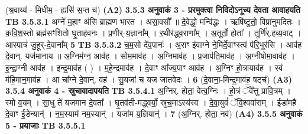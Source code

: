 \documentclass[17pt]{extarticle}
\begin{document}
{{{{{{{{{{{{{{{{{{{                  \newline
                                    (श्र॒वाय्य॑ - मिधीम॒ - ह्यसि॑ स॒प्त च॑) \textbf{(A2)} \newline \newline
                \textbf{ 3.5.3     अनुवाकं   3 - प्ररमुक्त्वा निविदोऽनूच्य देवता आवाहयति} \newline
                                \textbf{ TB 3.5.3.1} \newline
                  अग्ने॑ म॒हाꣳ अ॑सि ब्राह्मण भारत । असा॒वसौ᳚ ॥ दे॒वेद्धो॒ मन्वि॑द्धः । ऋषि॑ष्टुतो॒ विप्रा॑नुमदितः । क॒वि॒श॒स्तो ब्रह्म॑सꣳशितो घृ॒ताह॑वनः । प्र॒णीर्-य॒ज्ञाना᳚म् । र॒थीर॑द्ध्व॒राणा᳚म् । अ॒तूर्तो॒ होता᳚ । तूर्णि॑र्.हव्य॒वाट् । आस्पात्रं॑ जु॒हूर्-दे॒वाना᳚म् \textbf{ 5} \newline
                  \newline
                                \textbf{ TB 3.5.3.2} \newline
                  च॒म॒सो दे॑व॒पानः॑ । अ॒राꣳ इ॑वाग्ने ने॒मिर्दे॒वाꣳस्त्वं प॑रि॒भूर॑सि । आव॑ह दे॒वान्. यज॑मानाय ॥ अ॒ग्निम॑ग्न॒ आव॑ह । सोम॒माव॑ह । अ॒ग्निमाव॑ह । प्र॒जाप॑ति॒माव॑ह । अ॒ग्नीषोमा॒वाव॑ह । इ॒न्द्रा॒ग्नी आव॑ह । इन्द्र॒माव॑ह ( ) । म॒हे॒न्द्रमाव॑ह । दे॒वाꣳ आ᳚ज्य॒पाꣳ आव॑ह । अ॒ग्निꣳ हो॒त्रायाव॑ह । स्वं म॑हि॒मान॒माव॑ह । आ चा᳚ग्ने दे॒वान्. वह॑ । सु॒यजा॑ च यज जातवेदः । \textbf{ 6} \newline
                  \newline
                                    (दे॒वाना॒-मिन्द्र॒माव॑ह॒ षट्च॑) \textbf{(A3)} \newline \newline
                \textbf{ 3.5.4     अनुवाकं   4 - स्रुचावादापयति} \newline
                                \textbf{ TB 3.5.4.1} \newline
                  अ॒ग्निर्. होता॒ वेत्व॒ग्निः । हो॒त्रं ॅवे᳚त्तु प्रावि॒त्रम् । स्मो व॒यम् । सा॒धु ते॑ यजमान दे॒वता᳚ । घृ॒तव॑ती-मद्ध्वर्यो॒ स्रुच॒माऽस्य॑स्व । दे॒वा॒युवं॑ ॅवि॒श्ववा॑राम् । ईडा॑महै दे॒वाꣳ ई॒डेन्यान्॑ । न॒म॒स्याम॑ नम॒स्यान्॑ । यजा॑म य॒ज्ञियान्॑ । \textbf{ 7} \newline
                  \newline
                                    (अ॒ग्निर्. होता॒ नव॑) \textbf{(A4)} \newline \newline
                \textbf{ 3.5.5     अनुवाकं   5 - प्रयाजाः} \newline
                                \textbf{ TB 3.5.5.1} \newline
}}}}}}}}}}}}}}}}}}}
\end{document}
